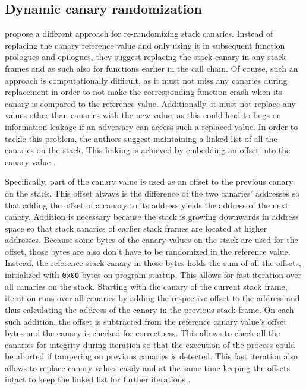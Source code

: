 \subsection{Dynamic canary randomization}
\label{subsec:dynamic-canary-randomization}

 propose a different approach for re-randomizing stack canaries.
Instead of replacing the canary reference value and only using it in subsequent function prologues and epilogues, they suggest replacing the stack canary in any stack frames and as such also for functions earlier in the call chain.
Of course, such an approach is computationally difficult, as it must not miss any canaries during replacement in order to not make the corresponding function crash when its canary is compared to the reference value.
Additionally, it must not replace any values other than canaries with the new value, as this could lead to bugs or information leakage if an adversary can access such a replaced value.
In order to tackle this problem, the authors suggest maintaining a linked list of all the canaries on the stack.
This linking is achieved by embedding an offset into the canary value \cite{Hawkins2016}.

Specifically, part of the canary value is used as an offset to the previous canary on the stack.
This offset always is the difference of the two canaries' addresses so that adding the offset of a canary to its address yields the address of the next canary.
Addition is necessary because the stack is growing downwards in address space so that stack canaries of earlier stack frames are located at higher addresses.
Because some bytes of the canary values on the stack are used for the offset, those bytes are also don't have to be randomized in the reference value.
Instead, the reference stack canary in those bytes holds the sum of all the offsets, initialized with \texttt{0x00} bytes on program startup.
This allows for fast iteration over all canaries on the stack.
Starting with the canary of the current stack frame, iteration runs over all canaries by adding the respective offset to the address and thus calculating the address of the canary in the previous stack frame.
On each such addition, the offset is subtracted from the reference canary value's offset bytes and the canary is checked for correctness.
This allows to check all the canaries for integrity during iteration so that the execution of the process could be aborted if tampering on previous canaries is detected.
This fast iteration also allows to replace canary values easily and at the same time keeping the offsets intact to keep the linked list for further iterations \cite{Hawkins2016}.

